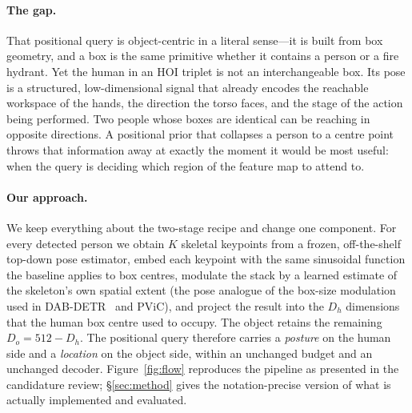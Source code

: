 \documentclass[12pt,a4paper]{article}
\begin{document}
\paragraph{The gap.} That positional query is object-centric in a literal
sense---it is built from box geometry, and a box is the same primitive whether
it contains a person or a fire hydrant. Yet the human in an HOI triplet is not
an interchangeable box. Its pose is a structured, low-dimensional signal that
already encodes the reachable workspace of the hands, the direction the torso
faces, and the stage of the action being performed. Two people whose boxes are
identical can be reaching in opposite directions. A positional prior that
collapses a person to a centre point throws that information away at exactly
the moment it would be most useful: when the query is deciding which region of
the feature map to attend to.

\paragraph{Our approach.} We keep everything about the two-stage recipe and
change one component. For every detected person we obtain $K$ skeletal
keypoints from a frozen, off-the-shelf top-down pose estimator, embed each
keypoint with the same sinusoidal function the baseline applies to box centres,
modulate the stack by a learned estimate of the skeleton's own spatial extent
(the pose analogue of the box-size modulation used in
DAB-DETR~\cite{liu2022dabdetr} and PViC), and project the result into the
$D_h$ dimensions that the human box centre used to occupy. The object retains
the remaining $D_o = 512 - D_h$. The positional query therefore carries a
\emph{posture} on the human side and a \emph{location} on the object side,
within an unchanged budget and an unchanged decoder. Figure~\ref{fig:flow}
reproduces the pipeline as presented in the candidature review;
\S\ref{sec:method} gives the notation-precise version of what is actually
implemented and evaluated.
\end{document}
